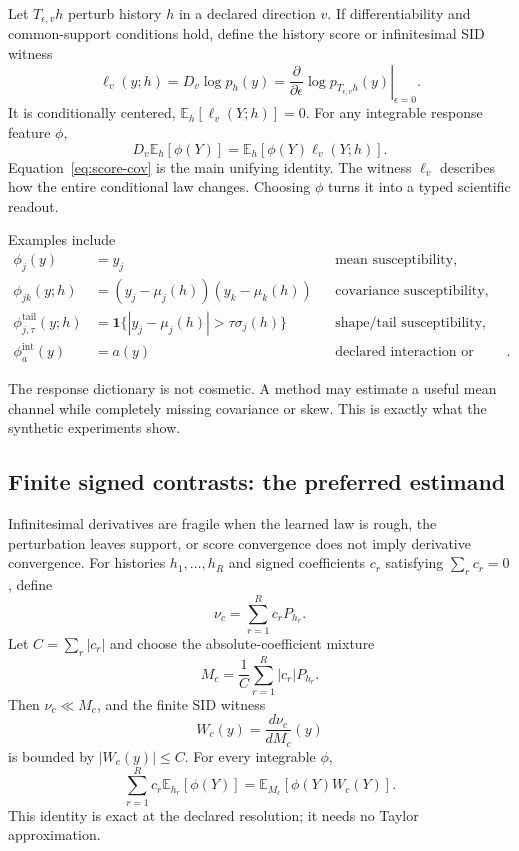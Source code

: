 \documentclass[10pt]{article}
\newcommand{\E}{\mathbb{E}}
\begin{document}
Let \(T_{\epsilon,v}h\) perturb history \(h\) in a declared direction \(v\). If differentiability and common-support conditions hold, define the history score or infinitesimal SID witness
\[
  \ell_v(y;h)
  =D_v\log p_h(y)
  =\left.\frac{\partial}{\partial\epsilon}
  \log p_{T_{\epsilon,v}h}(y)\right|_{\epsilon=0}.
\]
It is conditionally centered, \(\E_h[\ell_v(Y;h)]=0\). For any integrable response feature \(\phi\),
\begin{equation}
  D_v\E_h[\phi(Y)]
  =\E_h\!\left[\phi(Y)\ell_v(Y;h)\right].
  \label{eq:score-cov}
\end{equation}
Equation~\eqref{eq:score-cov} is the main unifying identity. The witness \(\ell_v\) describes how the entire conditional law changes. Choosing \(\phi\) turns it into a typed scientific readout.

Examples include
\begin{align*}
  \phi_j(y)&=y_j &&\text{mean susceptibility},\\
  \phi_{jk}(y;h)&=(y_j-\mu_j(h))(y_k-\mu_k(h))
    &&\text{covariance susceptibility},\\
  \phi^{\mathrm{tail}}_{j,\tau}(y;h)&=
    \mathbf 1\{|y_j-\mu_j(h)|>\tau\sigma_j(h)\}
    &&\text{shape/tail susceptibility},\\
  \phi^{\mathrm{int}}_a(y)&=a(y)
    &&\text{declared interaction or occupancy channel}.
\end{align*}

The response dictionary is not cosmetic. A method may estimate a useful mean channel while completely missing covariance or skew. This is exactly what the synthetic experiments show.

\subsection{Finite signed contrasts: the preferred estimand}

Infinitesimal derivatives are fragile when the learned law is rough, the perturbation leaves support, or score convergence does not imply derivative convergence. For histories \(h_1,\ldots,h_R\) and signed coefficients \(c_r\) satisfying \(\sum_r c_r=0\), define
\[
  \nu_c=\sum_{r=1}^R c_r P_{h_r}.
\]
Let \(C=\sum_r|c_r|\) and choose the absolute-coefficient mixture
\[
  M_c=\frac{1}{C}\sum_{r=1}^R |c_r|P_{h_r}.
\]
Then \(\nu_c\ll M_c\), and the finite SID witness
\[
  W_c(y)=\frac{d\nu_c}{dM_c}(y)
\]
is bounded by \(|W_c(y)|\le C\). For every integrable \(\phi\),
\begin{equation}
  \sum_{r=1}^R c_r\E_{h_r}[\phi(Y)]
  =\E_{M_c}[\phi(Y)W_c(Y)].
  \label{eq:finite-witness}
\end{equation}
This identity is exact at the declared resolution; it needs no Taylor approximation.
\end{document}
